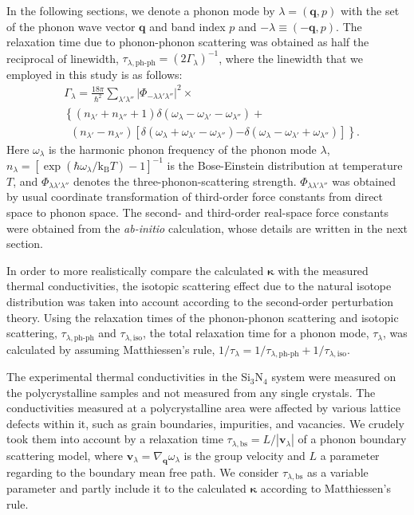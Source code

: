 \documentclass[twocolumn,amsmath,amssymb,a4paper,prb,superscriptaddress,floatfix]{revtex4-1}
\begin{document}
In the following sections, we denote a phonon mode by $\lambda=(\mathbf{q},p)$
with the set of the phonon wave vector $\mathbf{q}$ and band index $p$ and
$-\lambda \equiv (-\mathbf{q},p)$. The relaxation time due to phonon-phonon
scattering was obtained as half the reciprocal of linewidth,
$\tau_{\lambda,\text{ph-ph}}=(2\Gamma_\lambda)^{-1}$, where the linewidth that
we employed in this study is as follows:
\begin{align}
 \label{eq:linewidth}
 &\Gamma_\lambda = \frac{18\pi}{\hbar^2}
  \sum_{\lambda' \lambda''}
  \bigl|\Phi_{-\lambda\lambda'\lambda''}\bigl|^2 \times \nonumber \\ 
 &\left\{ (n_{\lambda'} + n_{\lambda''}+1) 
   \delta(\omega_\lambda-\omega_{\lambda'}-\omega_{\lambda''}) \right.
   + \nonumber \\ 
 &\;\;(n_{\lambda'}-n_{\lambda''})
  \left[\delta(\omega_\lambda +\omega_{\lambda'}-\omega_{\lambda''})
 \right. 
 \left. -\left. \delta(\omega_\lambda - \omega_{\lambda'}+\omega_{\lambda''})
 \right]\right\}.
\end{align}
Here $\omega_\lambda$ is the harmonic phonon frequency of the phonon mode
$\lambda$, $n_\lambda=[\exp(\hbar\omega_\lambda/\mathrm{k_B}T)-1]^{-1}$ is
the Bose-Einstein distribution at temperature $T$, and
$\Phi_{\lambda\lambda'\lambda''}$ denotes the three-phonon-scattering strength.
$\Phi_{\lambda\lambda'\lambda''}$ was obtained by usual coordinate
transformation of third-order force constants from direct space to phonon
space.\cite{phono3py} The second- and third-order real-space force constants
were obtained from the {\it ab-initio} calculation, whose details are written in the
next section.

In order to more realistically compare the  calculated $\boldsymbol{\kappa}$ with the
measured thermal conductivities, the isotopic scattering effect due to the natural isotope
distribution was taken into account according to the second-order perturbation
theory.\cite{tamura} Using the relaxation times of the phonon-phonon scattering
and isotopic scattering, $\tau_{\lambda,\text{ph-ph}}$ and
$\tau_{\lambda,\text{iso}}$, the total relaxation time for a phonon mode,
$\tau_{\lambda}$, was calculated by assuming Matthiessen's rule, 
$1/\tau_{\lambda} = 1/\tau_{\lambda,\text{ph-ph}} +
1/\tau_{\lambda,\text{iso}}$.

The experimental thermal conductivities in the Si$_3$N$_4$ system were
measured on the polycrystalline samples and not measured from any single
crystals. The conductivities measured at a polycrystalline area were affected
by various lattice defects within it, such as grain boundaries, impurities, and
vacancies. We crudely took them into account by a relaxation time
$\tau_{\lambda,\text{bs}}=L/|\mathbf{v}_\lambda|$ of a phonon boundary
scattering model, where $\mathbf{v}_\lambda = \nabla_{\mathbf{q}}\omega_\lambda$
is the group velocity and $L$ a parameter regarding to the boundary mean free
path. We consider $\tau_{\lambda,\text{bs}}$ as a variable parameter and partly
include it to the calculated $\boldsymbol{\kappa}$ according to Matthiessen's rule. 
\end{document}
